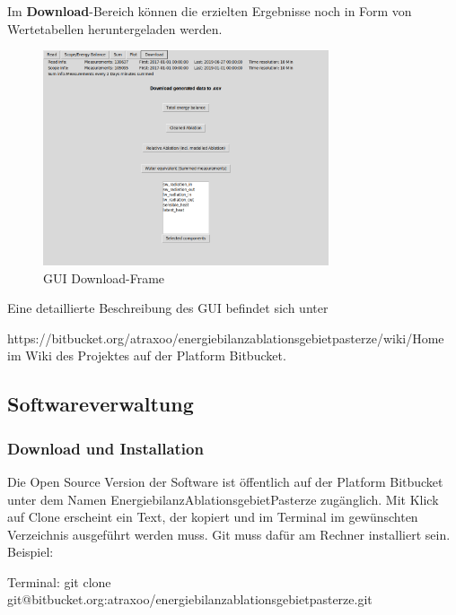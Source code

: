 \documentclass[12pt,a4paper]{article}
\newcommand{\guiplotsize}{0.75}
\begin{document}
Im \textbf{Download}-Bereich können die erzielten Ergebnisse noch in Form von Wertetabellen heruntergeladen werden.

\begin{figure}[H]
\centering
\includegraphics[width=\guiplotsize\textwidth]{pictures/GUI/Download_Frame.png}
\caption{GUI Download-Frame}
\label{fig:GUI Download-Frame}
\end{figure}

Eine detaillierte Beschreibung des GUI befindet sich unter

\textsf{\small https://bitbucket.org/atraxoo/energiebilanzablationsgebietpasterze/wiki/Home}
 im Wiki des Projektes auf der Platform Bitbucket.


\subsection{Softwareverwaltung}
\subsubsection{Download und Installation}
Die Open Source Version der Software ist öffentlich auf der  Platform Bitbucket unter dem Namen EnergiebilanzAblationsgebietPasterze zugänglich. Mit Klick auf Clone erscheint ein Text, der kopiert und im Terminal im gewünschten Verzeichnis ausgeführt werden muss. Git muss dafür am Rechner installiert sein.\\

Beispiel:

Terminal: \textsf{\small git clone git@bitbucket.org:atraxoo/energiebilanzablationsgebietpasterze.git}\\
\end{document}
